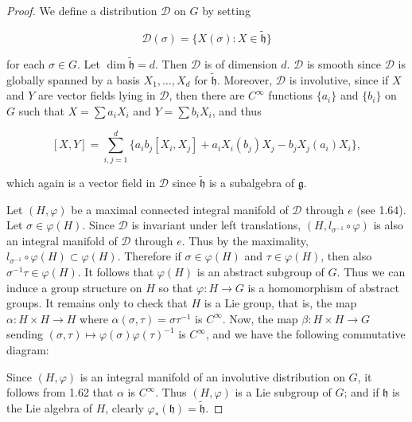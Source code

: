 \begin{proof}
We define a distribution $\mathcal{D}$ on $G$ by setting

\begin{equation}
\tag{1}\label{eq:3.19:1}
\mathcal{D}(\sigma)=\{X(\sigma)\colon X\in\tilde{\mathfrak{h}}\}
\end{equation}

for each $\sigma \in G$. Let $\dim \tilde{\mathfrak{h}}=d$. Then $\mathcal{D}$ is of dimension $d$. $\mathcal{D}$ is smooth since $\mathcal{D}$ is globally spanned by a basis $X_1, \ldots, X_d$ for $\widetilde{\mathfrak{h}}$. Moreover, $\mathcal{D}$ is involutive, since if $X$ and $Y$ are vector fields lying in $\mathcal{D}$, then there are $C^\infty$ functions $\{a_i\}$ and $\{b_i\}$ on $G$ such that $X = \sum a_i X_i$ and $Y = \sum b_i X_i$, and thus

\begin{equation}
\tag{2}\label{eq:3.19:2}
[X,Y]=\sum_{i,j=1}^{d}\{a_{i}b_{j}[X_{i},X_{j}]+a_{i}X_{i}(b_{j})X_{j}-b_{j}X_{j}(a_{i})X_{i}\},
\end{equation}

which again is a vector field in $\mathcal{D}$ since $\tilde{\mathfrak{h}}$ is a subalgebra of $\mathfrak{g}$.

Let $(H,\varphi)$ be a maximal connected integral manifold of $\mathcal{D}$ through $e$ (see 1.64). Let $\sigma\in\varphi(H)$. Since $\mathcal{D}$ is invariant under left translations, $(H,l_{\sigma^{-1}}\circ\varphi)$ is also an integral manifold of $\mathcal{D}$ through $e$. Thus by the maximality, $l_{\sigma^{-1}}\circ\varphi(H)\subset\varphi(H)$. Therefore if $\sigma\in\varphi(H)$ and $\tau\in\varphi(H)$, then also $\sigma^{-1}\tau\in\varphi(H)$. It follows that $\varphi(H)$ is an abstract subgroup of $G$. Thus we can induce a group structure on $H$ so that $\varphi:H\to G$ is a homomorphism of abstract groups. It remains only to check that $H$ is a Lie group, that is, the map $\alpha:H\times H\to H$ where $\alpha(\sigma,\tau)=\sigma\tau^{-1}$ is $C^\infty$. Now, the map $\beta:H\times H\to G$ sending $(\sigma,\tau)\mapsto\varphi(\sigma)\varphi(\tau)^{-1}$ is $C^\infty$, and we have the following commutative diagram:

\begin{center}
\end{center}

Since $(H,\varphi)$ is an integral manifold of an involutive distribution on $G$, it follows from 1.62 that $\alpha$ is $C^\infty$. Thus $(H,\varphi)$ is a Lie subgroup of $G$; and if $\mathfrak{h}$ is the Lie algebra of $H$, clearly $\varphi_{*}(\mathfrak{h})=\widetilde{\mathfrak{h}}$.


\end{proof}
